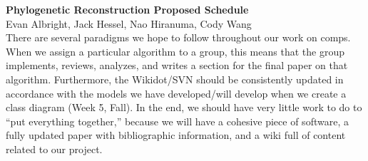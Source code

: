 \documentclass[10pt]{article}
\begin{document}
\noindent
{\Large\textbf{Phylogenetic Reconstruction Proposed Schedule}}\\
Evan Albright, Jack Hessel, Nao Hiranuma, Cody Wang
\\
There are several paradigms we hope to follow throughout our work on
comps. When we assign a particular algorithm to a group, this means
that the group implements, reviews, analyzes, and writes a section
for the final paper on that algorithm. Furthermore, the Wikidot/SVN
should be consistently updated in accordance with the models we have
developed/will develop when we create a class diagram (Week 5, Fall).
In the end, we should have very little work to do to ``put everything
together,'' because we will have a cohesive piece of software,
a fully updated paper with bibliographic information, and a wiki
full of content related to our project.\\
\end{document}
